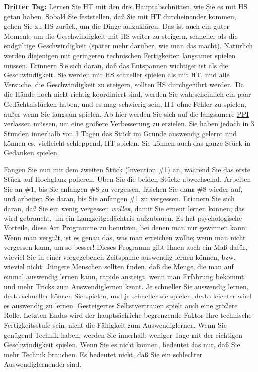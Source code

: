 \textbf{Dritter Tag:} Lernen Sie HT mit den drei Hauptabschnitten, wie Sie es mit HS getan haben.
Sobald Sie feststellen, daß Sie mit HT durcheinander kommen, gehen Sie zu HS zurück, um die Dinge aufzuklären.
Das ist auch ein guter Moment, um die Geschwindigkeit mit HS weiter zu steigern, schneller als die endgültige Geschwindigkeit (später mehr darüber, wie man das macht).
Natürlich werden diejenigen mit geringeren technischen Fertigkeiten langsamer spielen müssen.
Erinnern Sie sich daran, daß das Entspannen wichtiger ist als die Geschwindigkeit.
Sie werden mit HS schneller spielen als mit HT, und alle Versuche, die Geschwindigkeit zu steigern, sollten HS durchgeführt werden.
Da die Hände noch nicht richtig koordiniert sind, werden Sie wahrscheinlich ein paar Gedächtnislücken haben, und es mag schwierig sein, HT ohne Fehler zu spielen, außer wenn Sie langsam spielen.
Ab hier werden Sie sich auf die langsamere \hyperref[c1ii15]{PPI} verlassen müssen, um eine größere Verbesserung zu erzielen.
Sie haben jedoch in 3 Stunden innerhalb von 3 Tagen das Stück im Grunde auswendig gelernt und können es, vielleicht schleppend, HT spielen.
Sie können auch das ganze Stück in Gedanken spielen.

Fangen Sie nun mit dem zweiten Stück (Invention \#1) an, während Sie das erste Stück auf Hochglanz polieren.
Üben Sie die beiden Stücke abwechselnd.
Arbeiten Sie an \#1, bis Sie anfangen \#8 zu vergessen, frischen Sie dann \#8 wieder auf, und arbeiten Sie daran, bis Sie anfangen \#1 zu vergessen.
Erinnern Sie sich daran, daß Sie ein wenig vergessen \textit{wollen}, damit Sie erneut lernen können; das wird gebraucht, um ein Langzeitgedächtnis aufzubauen.
Es hat psychologische Vorteile, diese Art Programme zu benutzen, bei denen man nur gewinnen kann: Wenn man vergißt, ist es genau das, was man erreichen wollte; wenn man nicht vergessen kann, um so besser!
Dieses Programm gibt Ihnen auch ein Maß dafür, wieviel Sie in einer vorgegebenen Zeitspanne auswendig lernen können, bzw. wieviel nicht.
Jüngere Menschen sollten finden, daß die Menge, die man auf einmal auswendig lernen kann, rapide ansteigt, wenn man Erfahrung bekommt und mehr Tricks zum Auswendiglernen kennt.
Je schneller Sie auswendig lernen, desto schneller können Sie spielen, und je schneller sie spielen, desto leichter wird es auswendig zu lernen.
Gesteigertes Selbstvertrauen spielt auch eine größere Rolle.
Letzten Endes wird der hauptsächliche begrenzende Faktor Ihre technische Fertigkeitsstufe sein, nicht die Fähigkeit zum Auswendiglernen.
Wenn Sie genügend Technik haben, werden Sie innerhalb weniger Tage mit der richtigen Geschwindigkeit spielen.
Wenn Sie es nicht können, bedeutet das nur, daß Sie mehr Technik brauchen.
Es bedeutet nicht, daß Sie ein schlechter Auswendiglernender sind.


